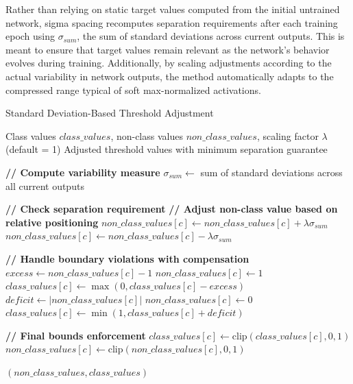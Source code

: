 \documentclass[12pt,fleqn,a4paper]{article}
\begin{document}
Rather than relying on static target values computed from the initial untrained network, sigma spacing recomputes separation requirements after each training epoch using $\sigma_{sum}$, the sum of standard deviations across current outputs. This is meant to ensure that target values remain relevant as the network's behavior evolves during training. Additionally, by scaling adjustments according to the actual variability in network outputs, the method automatically adapts to the compressed range typical of soft max-normalized activations.

\begin{algorithm}[H]
\caption{Standard Deviation-Based Threshold Adjustment}
\label{alg:sigma_spacing}
\begin{algorithmic}[1]
\REQUIRE Class values $class\_values$, non-class values $non\_class\_values$, scaling factor $\lambda$ (default = 1)
\ENSURE Adjusted threshold values with minimum separation guarantee

\STATE \textbf{// Compute variability measure}
\STATE $\sigma_{sum} \leftarrow$ sum of standard deviations across all current outputs

    \STATE \textbf{// Check separation requirement}
        \STATE \textbf{// Adjust non-class value based on relative positioning}
            \STATE $non\_class\_values[c] \leftarrow non\_class\_values[c] + \lambda \sigma_{sum}$
        \ELSE
            \STATE $non\_class\_values[c] \leftarrow non\_class\_values[c] - \lambda \sigma_{sum}$
        \ENDIF
        
        \STATE \textbf{// Handle boundary violations with compensation}
            \STATE $excess \leftarrow non\_class\_values[c] - 1$
            \STATE $non\_class\_values[c] \leftarrow 1$
            \STATE $class\_values[c] \leftarrow \max(0, class\_values[c] - excess)$
            \STATE $deficit \leftarrow |non\_class\_values[c]|$
            \STATE $non\_class\_values[c] \leftarrow 0$
            \STATE $class\_values[c] \leftarrow \min(1, class\_values[c] + deficit)$
        \ENDIF
    \ENDIF
    
    \STATE \textbf{// Final bounds enforcement}
    \STATE $class\_values[c] \leftarrow \text{clip}(class\_values[c], 0, 1)$
    \STATE $non\_class\_values[c] \leftarrow \text{clip}(non\_class\_values[c], 0, 1)$
\ENDFOR

\RETURN $(non\_class\_values, class\_values)$
\end{algorithmic}
\end{algorithm}
\end{document}
